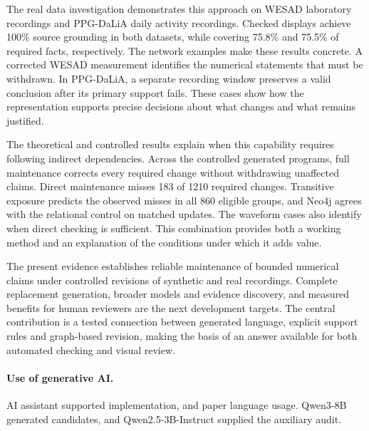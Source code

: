 \documentclass[runningheads]{llncs}
\newcommand{\SemPredictionGroups}{860}
\newcommand{\SemGeneratedRequired}{1210}
\newcommand{\SemGeneratedMissed}{183}
\begin{document}
The real data investigation demonstrates this approach on WESAD laboratory
recordings and PPG-DaLiA daily activity recordings. Checked displays achieve
100\% source grounding in both datasets, while covering 75.8\% and 75.5\%
of required facts, respectively. The network examples make these results
concrete. A corrected WESAD measurement identifies the numerical statements
that must be withdrawn. In PPG-DaLiA, a separate recording window preserves
a valid conclusion after its primary support fails. These cases show how
the representation supports precise decisions about what changes and
what remains justified.

The theoretical and controlled results explain when this capability
requires following indirect dependencies. Across the controlled generated
programs, full maintenance corrects every required change without
withdrawing unaffected claims. Direct maintenance misses
\SemGeneratedMissed{} of \SemGeneratedRequired{} required changes.
Transitive exposure predicts the observed misses in all
\SemPredictionGroups{} eligible groups, and Neo4j agrees with the relational
control on matched updates. The waveform cases also identify when direct
checking is sufficient. This combination provides both a working method
and an explanation of the conditions under which it adds value.

The present evidence establishes reliable maintenance of bounded numerical
claims under controlled revisions of synthetic and real recordings.
Complete replacement generation, broader models and evidence discovery,
and measured benefits for human reviewers are the next development targets.
The central contribution is a tested connection between generated
language, explicit support rules and graph-based revision, making the
basis of an answer available for both automated checking and visual review.


\paragraph{Use of generative AI.}
AI assistant supported implementation,  and paper language usage.
Qwen3-8B generated candidates, and Qwen2.5-3B-Instruct supplied the auxiliary audit.
\end{document}
